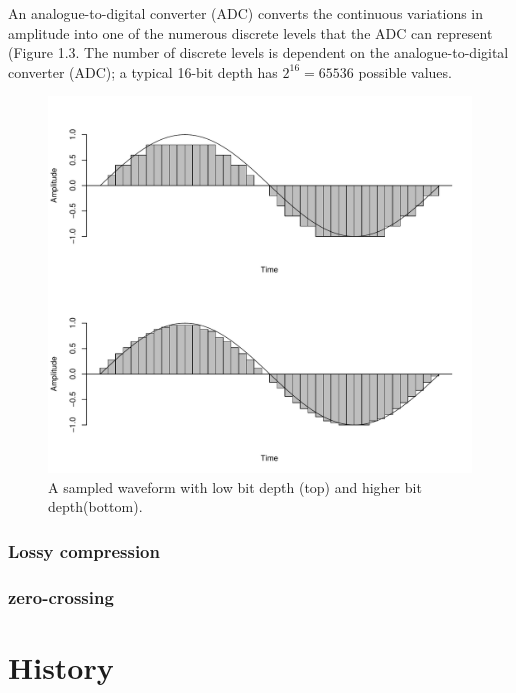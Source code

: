 \documentclass[
]{book}
\begin{document}
An analogue-to-digital converter (ADC) converts the continuous variations in amplitude into one of the numerous discrete levels that the ADC can represent (Figure 1.3. The number of discrete levels is dependent on the analogue-to-digital converter (ADC); a typical 16-bit depth has \(2^{16}=65536\) possible values.

\begin{figure}

{\centering \includegraphics[width=0.9\linewidth]{_main_files/figure-latex/sampled-wave-1} 

}

\caption{A sampled waveform with low bit depth (top) and higher bit depth(bottom).}\label{fig:sampled-wave}
\end{figure}

\hypertarget{lossy-compression}{%
\subsection{Lossy compression}\label{lossy-compression}}

\hypertarget{zero-crossing-files}{%
\subsection{zero-crossing}\label{zero-crossing-files}}

\hypertarget{history}{%
\chapter{History}\label{history}}
\end{document}
